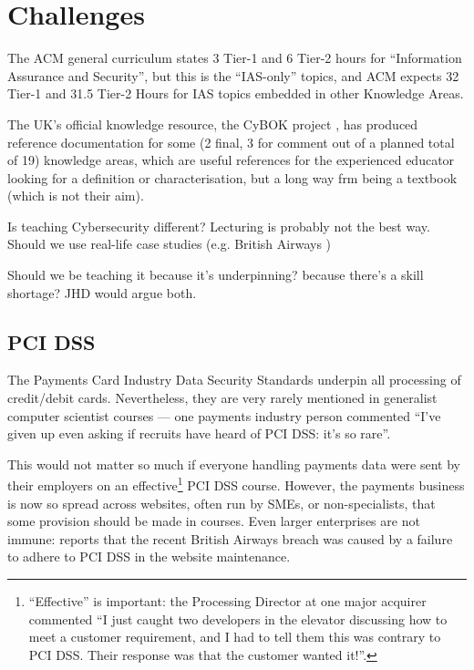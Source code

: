 \documentclass[conference]{IEEEtran}
\begin{document}
\section{Challenges}

The ACM general curriculum \cite{ACM2013a} states 3 Tier-1 and 6 Tier-2 hours for ``Information Assurance and Security'', but this is the ``IAS-only'' topics, and ACM expects 32 Tier-1 and 31.5 Tier-2 Hours for IAS topics embedded in other Knowledge Areas.

The UK's official knowledge resource, the CyBOK project \cite{Bristol2019a}, has produced reference documentation for some (2 final, 3 for comment out of a planned total of 19) knowledge areas, which are useful references for the experienced educator looking for a definition or characterisation, but a long way frm being a textbook (which is not their aim).

Is teaching Cybersecurity different? Lecturing is probably not the best way. Should we use real-life case studies (e.g. British Airways \cite{Barth2018a})

  Should we be teaching it because it's underpinning? because there's a skill shortage?  JHD would argue both.


\subsection{PCI DSS}\label{sec:PCIDSS}
The Payments Card Industry Data Security Standards \cite{PCI2018b} underpin all processing of credit/debit cards. Nevertheless, they are very rarely mentioned in generalist computer scientist courses --- one payments industry person commented ``I've given up even asking if recruits have heard of PCI DSS: it's so rare''. 

This would not matter so much if everyone handling payments data were sent by their employers on an effective\footnote{``Effective'' is important: the Processing Director at one major acquirer commented ``I just caught two developers in the elevator discussing how to meet a customer requirement, and I had to tell them this was contrary to PCI DSS. Their response was that the customer wanted it!''.} PCI DSS course. However, the payments business is now so spread across websites, often run by SMEs, or non-specialists, that some provision should be made in courses.  Even larger enterprises are not immune: \cite{Barth2018a} reports that the recent British Airways breach was caused by a failure to adhere to PCI DSS in the website maintenance.
\end{document}
